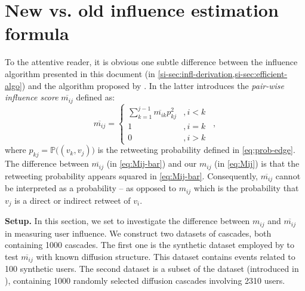 
\section{New vs. old influence estimation formula}
\label{si-sec:new-vs-old-formula}


To the attentive reader, it is obvious one subtle difference between the influence algorithm presented in this document (in \cref{si-sec:infl-derivation,si-sec:efficient-algo}) and the algorithm proposed by \citet{Rizoiu2018a}.
In the latter introduces the \emph{pair-wise influence score} $\overline{m_{ij}}$ defined as:
\begin{equation} \label{eq:Mij-bar}
\overline{m_{ij}}=
\left\{
\begin{array}{ll}
	\sum^{j-1}_{k=1} \overline{m_{ik}}p^2_{kj} &,i < k \\
	1 & ,i = k \\
	0 & ,i > k
\end{array}
\right. \enspace ,
\end{equation} 
where $p_{kj} = \mathds{P}\big((v_k, v_j)\big)$ is the retweeting probability defined in \cref{eq:prob-edge}.
The difference between $\overline{m_{ij}}$ (in \cref{eq:Mij-bar}) and our $m_{ij}$ (in \cref{eq:Mij}) is that the retweeting probability appears squared in \cref{eq:Mij-bar}.
Consequently, $\overline{m_{ij}}$ cannot be interpreted as a probability -- as opposed to $m_{ij}$ which is the probability that $v_j$ is a direct or indirect retweet of $v_i$.

\textbf{Setup.}
In this section, we set to investigate the difference between $m_{ij}$ and $\overline{m_{ij}}$ in measuring user influence.
We construct two datasets of cascades, both containing 1000 cascades.
The first one is the synthetic dataset employed by \citet{Rizoiu2018a} to test $\overline{m_{ij}}$ with known diffusion structure.
This dataset contains events related to 100 synthetic users.
The second dataset is a subset of the \debate dataset (introduced in \citep{Rizoiu2018a}), containing 1000 randomly selected diffusion cascades involving 2310 users.

